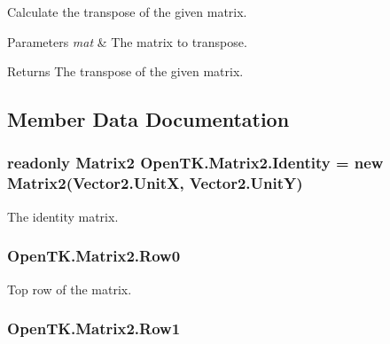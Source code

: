 Calculate the transpose of the given matrix. 


\begin{DoxyParams}{Parameters}
{\em mat} & The matrix to transpose.\\
\hline
\end{DoxyParams}
\begin{DoxyReturn}{Returns}
The transpose of the given matrix.
\end{DoxyReturn}


\subsection{Member Data Documentation}
\hypertarget{struct_open_t_k_1_1_matrix2_aa1ece0676cf9a9ca5e49671c03dd0ba0}{
\subsubsection[{Identity}]{\setlength{\rightskip}{0pt plus 5cm}readonly {\bf Matrix2} Open\-T\-K.\-Matrix2.\-Identity = new {\bf Matrix2}({\bf Vector2.\-Unit\-X}, {\bf Vector2.\-Unit\-Y})\hspace{0.3cm}{\ttfamily [static]}}}\label{struct_open_t_k_1_1_matrix2_aa1ece0676cf9a9ca5e49671c03dd0ba0}


The identity matrix. 

\hypertarget{struct_open_t_k_1_1_matrix2_a7712c9d0c02c87fa1d98f4bb54cfc83f}{
\subsubsection[{Row0}]{ Open\-T\-K.\-Matrix2.\-Row0}}\label{struct_open_t_k_1_1_matrix2_a7712c9d0c02c87fa1d98f4bb54cfc83f}


Top row of the matrix. 

\hypertarget{struct_open_t_k_1_1_matrix2_a27718ab92c9a8bad7f1d054b3f61841f}{
\subsubsection[{Row1}]{ Open\-T\-K.\-Matrix2.\-Row1}}\label{struct_open_t_k_1_1_matrix2_a27718ab92c9a8bad7f1d054b3f61841f}


